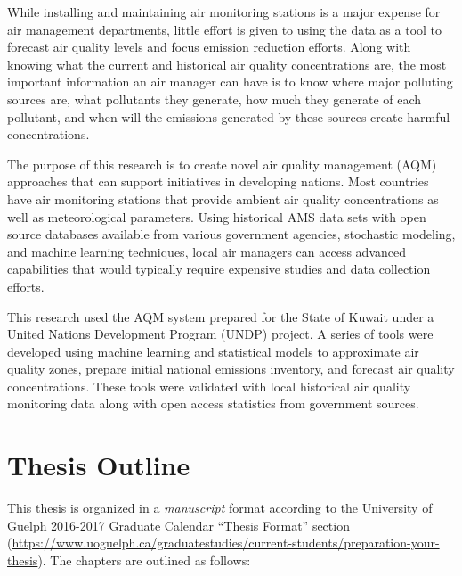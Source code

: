 While installing and maintaining air monitoring stations is a major expense for air management departments,  little effort is given to using the data as a tool to forecast air quality levels and focus emission reduction efforts. Along with knowing what the current and historical air quality concentrations are, the most important information an air manager can have is to know where major polluting sources are, what pollutants they generate, how much they generate of each pollutant, and when will the emissions generated by these sources create harmful concentrations.

The purpose of this research is to create novel air quality management (AQM) approaches that can support initiatives in developing nations. Most countries have air monitoring stations that provide ambient air quality concentrations as well as meteorological parameters. Using historical AMS data sets with open source databases available from various government agencies, stochastic modeling, and machine learning techniques, local air managers can access advanced capabilities that would typically require expensive studies and data collection efforts.

This research used the AQM system prepared for the State of Kuwait under a United Nations Development Program (UNDP) project. A series of tools were developed using machine learning and statistical models to approximate air quality zones, prepare initial national emissions inventory, and forecast air quality concentrations.  These tools were validated with local historical air quality monitoring data along with open access statistics from government sources.

\section{Thesis Outline}
This thesis is organized in a \textit{manuscript} format according to the University of Guelph 2016-2017 Graduate Calendar ``Thesis Format'' section (\url{https://www.uoguelph.ca/graduatestudies/current-students/preparation-your-thesis}).  The chapters are outlined as follows:

